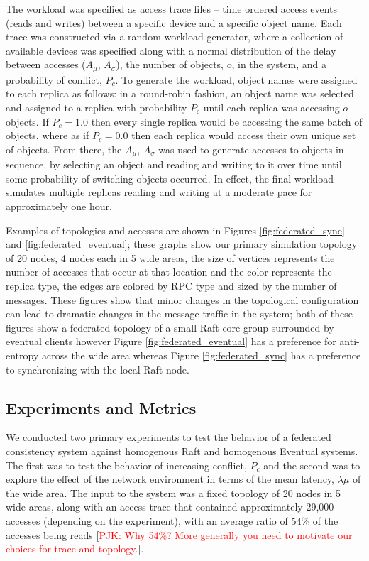 \documentclass[10pt,conference,letterpaper]{IEEEtran}
\newcommand{\todo}[1]{{\textcolor{red}{#1}}}
\newcommand{\pjk}[1]{[\todo{PJK: #1}]}
\begin{document}
The workload was specified as access trace files -- time ordered access events (reads and writes) between a specific device and a specific object name. Each trace was constructed via a random workload generator, where a collection of available devices was specified along with a normal distribution of the delay between accesses ($A_{\mu}$, $A_{\sigma}$), the number of objects, $o$, in the system, and a probability of conflict, $P_c$. To generate the workload, object names were assigned to each replica as follows: in a round-robin fashion, an object name was selected and assigned to a replica with probability $P_c$ until each replica was accessing $o$ objects. If $P_c = 1.0$ then every single replica would be accessing the same batch of objects, where as if $P_c = 0.0$ then each replica would access their own unique set of objects. From there, the $A_{\mu}$, $A_{\sigma}$ was used to generate accesses to objects in sequence, by selecting an object and reading and writing to it over time until some probability of switching objects occurred. In effect, the final workload simulates multiple replicas reading and writing at a moderate pace for approximately one hour.

Examples of topologies and accesses are shown in Figures \ref{fig:federated_sync} and \ref{fig:federated_eventual}; these graphs show our primary simulation topology of 20 nodes, 4 nodes each in 5 wide areas, the size of vertices represents the number of accesses that occur at that location and the color represents the replica type, the edges are colored by RPC type and sized by the number of messages. These figures show that minor changes in the topological configuration can lead to dramatic changes in the message traffic in the system; both of these figures show a federated topology of a small Raft core group surrounded by eventual clients however Figure \ref{fig:federated_eventual} has a preference for anti-entropy across the wide area whereas Figure \ref{fig:federated_sync} has a preference to synchronizing with the local Raft node.

\subsection{Experiments and Metrics}

We conducted two primary experiments to test the behavior of a federated consistency system against homogenous Raft and homogenous Eventual systems. The first was to test the behavior of increasing conflict, $P_c$ and the second was to explore the effect of the network environment in terms of the mean latency, $\lambda{\mu}$ of the wide area. The input to the system was a fixed topology of 20 nodes in 5 wide areas, along with an access trace that contained approximately 29,000 accesses (depending on the experiment), with an average ratio of 54\% of the accesses being reads \pjk{Why 54\%? More generally you need to motivate our choices for trace and topology.}.
\end{document}
